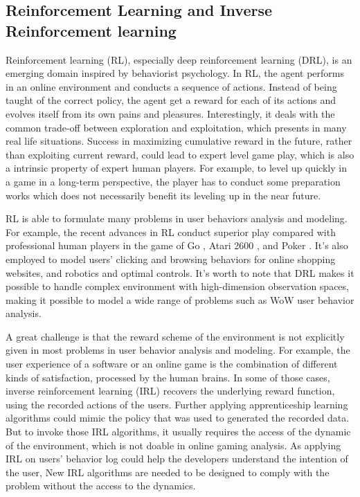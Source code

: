 \documentclass{sigchi}
\begin{document}
\subsection{Reinforcement Learning and Inverse Reinforcement learning}

Reinforcement learning (RL), especially deep reinforcement learning (DRL), is an emerging domain inspired by behaviorist psychology. 
In RL, the agent performs in an online environment and conducts a sequence of actions.
Instead of being taught of the correct policy, the agent get a reward for each of its actions and evolves itself from its own pains and pleasures.
Interestingly, it deals with the common trade-off between exploration and exploitation, which presents in many real life situations.
Success in maximizing cumulative reward in the future, rather than exploiting current reward, could lead to expert level game play, which is also a intrinsic property of expert human players.
For example, to level up quickly in a game in a long-term perspective, the player has to conduct some preparation works which does not necessarily benefit its leveling up in the near future.

RL is able to formulate many problems in user behaviors analysis and modeling.
For example, the recent advances in RL conduct superior play compared with professional human players in the game of Go \cite{silver2016mastering}, Atari 2600 \cite{mnih2015human}, and Poker \cite{heinrich2016deep}.
It's also employed to model users' clicking and browsing behaviors for online shopping websites, and robotics and optimal controls.
It's worth to note that DRL makes it possible to handle complex environment with high-dimension observation spaces, making it possible to model a wide range of problems such as WoW user behavior analysis.

A great challenge is that the reward scheme of the environment is not explicitly given in most problems in user behavior analysis and modeling.
For example, the user experience of a software or an online game is the combination of different kinds of satisfaction, processed by the human brains.
In some of those cases, inverse reinforcement learning (IRL) \cite{ratliff2006maximum,ng2000algorithms} recovers the underlying reward function, using the recorded actions of the users.
Further applying apprenticeship learning algorithms \cite{abbeel2004apprenticeship} could mimic the policy that was used to generated the recorded data.
But to invoke those IRL algorithms, it usually requires the access of the dynamic of the environment, which is not doable in online gaming analysis.
As applying IRL on users' behavior log could help the developers understand the intention of the user, New IRL algorithms are needed to be designed to comply with the problem without the access to the dynamics.
\end{document}
